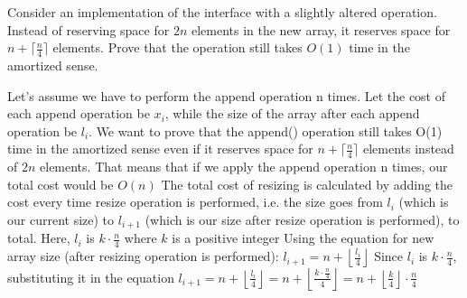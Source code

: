 \documentclass[addpoints]{exam}
\begin{document}

\begin{questions}


  Consider an  implementation of the  interface with a slightly altered  operation. Instead of reserving space for $2n$ elements in the new array, it reserves space for $n + \lceil \frac{n}{4} \rceil$ elements. Prove that the  operation still takes $O(1)$ time in the amortized sense.
  \begin{solution}
    \newline
    Let's assume we have to perform the append operation n times. 
    Let the cost of each append operation be $x_i$, while the size of the array after each append operation be $l_i$. 
    \newline
    \newline
    We want to prove that the append() operation still takes O(1) time in the amortized sense even if it reserves space for $n + \lceil \frac{n}{4} \rceil$ elements instead of $2n$ elements.
    That means that if we apply the append operation n times, our total cost would be $O(n)$
    \newline
    \newline
    The total cost of resizing is calculated by adding the cost every time resize operation is performed, i.e. the size goes from $l_i$ (which is our current size) to $l_{i+1}$ (which is our size after resize operation is performed), to total.  Here, $l_i$ is $k \cdot \frac{n}{4}$ where $k$ is a positive integer
    \newline
    \newline
    Using the equation for new array size (after resizing operation is performed):
    \newline
    \newline
    $l_{i+1} = n + \left\lfloor \frac{l_i}{4} \right\rfloor$
    \newline
    \newline
    Since $l_i$ is $k \cdot \frac{n}{4}$, substituting it in the equation $l_{i+1} = n + \left\lfloor \frac{l_i}{4} \right\rfloor = n + \left\lfloor \frac{k \cdot \frac{n}{4}}{4} \right\rfloor = n + \left\lfloor \frac{k}{4} \right\rfloor \cdot \frac{n}{4}$

\end{solution}
\end{questions}
\end{document}

